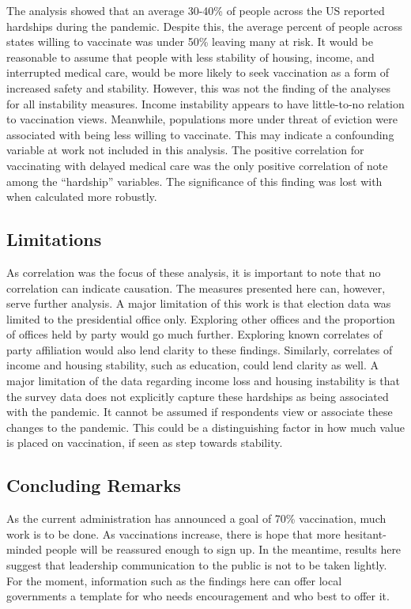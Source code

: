 \documentclass[
]{article}
\begin{document}
The analysis showed that an average 30-40\% of people across the US
reported hardships during the pandemic. Despite this, the average
percent of people across states willing to vaccinate was under 50\%
leaving many at risk. It would be reasonable to assume that people with
less stability of housing, income, and interrupted medical care, would
be more likely to seek vaccination as a form of increased safety and
stability. However, this was not the finding of the analyses for all
instability measures. Income instability appears to have little-to-no
relation to vaccination views. Meanwhile, populations more under threat
of eviction were associated with being less willing to vaccinate. This
may indicate a confounding variable at work not included in this
analysis. The positive correlation for vaccinating with delayed medical
care was the only positive correlation of note among the ``hardship''
variables. The significance of this finding was lost with when
calculated more robustly.

\hypertarget{limitations}{%
\subsection{Limitations}\label{limitations}}

As correlation was the focus of these analysis, it is important to note
that no correlation can indicate causation. The measures presented here
can, however, serve further analysis. A major limitation of this work is
that election data was limited to the presidential office only.
Exploring other offices and the proportion of offices held by party
would go much further. Exploring known correlates of party affiliation
would also lend clarity to these findings. Similarly, correlates of
income and housing stability, such as education, could lend clarity as
well. A major limitation of the data regarding income loss and housing
instability is that the survey data does not explicitly capture these
hardships as being associated with the pandemic. It cannot be assumed if
respondents view or associate these changes to the pandemic. This could
be a distinguishing factor in how much value is placed on vaccination,
if seen as step towards stability.

\hypertarget{concluding-remarks}{%
\subsection{Concluding Remarks}\label{concluding-remarks}}

As the current administration has announced a goal of 70\% vaccination,
much work is to be done. As vaccinations increase, there is hope that
more hesitant-minded people will be reassured enough to sign up. In the
meantime, results here suggest that leadership communication to the
public is not to be taken lightly. For the moment, information such as
the findings here can offer local governments a template for who needs
encouragement and who best to offer it.
\end{document}
